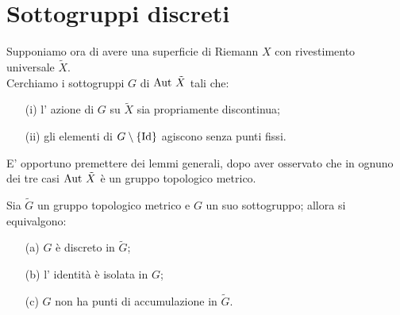 \section{Sottogruppi discreti}
Supponiamo ora di avere una superficie di Riemann $X$ con rivestimento universale $\tilde X$.\\
Cerchiamo i sottogruppi $G$ di $\text{Aut }{\tilde{X}}$ tali che:
\begin{itemize}
\item[(i)] l' azione di $G$ su $\tilde{X}$ sia propriamente discontinua;
\item[(ii)] gli elementi di $G\setminus\{\text{Id}\}$ agiscono senza punti fissi.
\end{itemize}
E' opportuno premettere dei lemmi generali, dopo aver osservato che in ognuno dei tre casi $\text{Aut }{\tilde{X}}$ è un gruppo topologico metrico.
\begin{lemma}Sia $\tilde G$ un gruppo topologico metrico e $G$ un suo sottogruppo; allora si equivalgono:
\begin{itemize}
\item[(a)] $G$ è discreto in $\tilde G$;
\item[(b)] l' identità è isolata in $G$;
\item[(c)] $G$ non ha punti di accumulazione in $\tilde G$.
\end{itemize}
\end{lemma}

